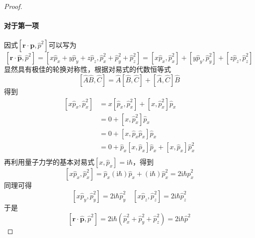 \begin{proof}
    \paragraph{对于第一项}
    因式$\left[\boldsymbol{r}\cdot\boldsymbol{p}, \hat{p}^2\right]$可以写为
    $$
        \left[\boldsymbol{r}\cdot\hat{\boldsymbol{p}}, \hat{p}^2\right]
        =\left[x\hat{p}_x + y\hat{p}_y + z\hat{p}_z, \hat{p}_x^2+\hat{p}_y^2+\hat{p}_z^2\right]
        =\left[x\hat{p}_x, \hat{p}_x^2\right] + \left[y\hat{p}_y, \hat{p}_y^2\right] + \left[z\hat{p}_z, \hat{p}_z^2\right]
    $$
    显然具有极佳的轮换对称性，根据对易式的代数恒等式
    $$
        \left[\hat{A}\hat{B}, \hat{C}\right]=\hat{A}\left[\hat{B}, \hat{C}\right]+\left[\hat{A}, \hat{C}\right]\hat{B}
    $$
    得到
    $$
        \begin{aligned}
            \left[x\hat{p}_x, \hat{p}_x^2\right]
             & = x\left[\hat{p}_x, \hat{p}_x^2\right] + \left[x, \hat{p}_x^2\right]\hat{p}_x            \\
             & = 0 + \left[x, \hat{p}_x^2\right]\hat{p}_x                                               \\
             & = 0 + \left[x, \hat{p}_x\hat{p}_x\right]\hat{p}_x                                        \\
             & = 0 + \hat{p}_x\left[x, \hat{p}_x\right]\hat{p}_x + \left[x, \hat{p}_x\right]\hat{p}_x^2 \\
        \end{aligned}
    $$
    再利用量子力学的基本对易式$[x, \hat{p}_x]=\mathrm{i}\hbar$，得到
    $$
        \left[x\hat{p}_x, \hat{p}_x^2\right]
        =\hat{p}_x(\mathrm{i}\hbar)\hat{p}_x + (\mathrm{i}\hbar)\hat{p}_x^2
        =2\mathrm{i}\hbar\hat{p}_x^2
    $$
    同理可得
    $$
        \left[x\hat{p}_y, \hat{p}_y^2\right] = 2\mathrm{i}\hbar\hat{p}_y^2 \quad
        \left[x\hat{p}_z, \hat{p}_z^2\right] = 2\mathrm{i}\hbar\hat{p}_z^2
    $$
    于是
    $$
        \left[\boldsymbol{r}\cdot\hat{\boldsymbol{p}}, \hat{p}^2\right] = 2\mathrm{i}\hbar\left(\hat{p}_x^2 + \hat{p}_y^2 + \hat{p}_z^2\right)
        =2\mathrm{i}\hbar\hat{p}^2
    $$

\end{proof}

